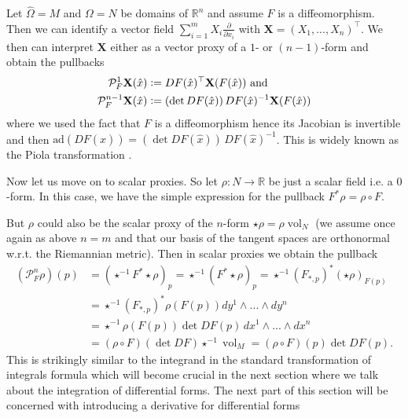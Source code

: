 \documentclass[12pt,a4paper]{article}
\numberwithin{equation}{subsection}
\numberwithin{lemma}{subsection}
\theoremstyle{definition}
\DeclareMathOperator{\vol}{vol}
\newcommand{\real}{\mathbb{R}}
\begin{document}
Let $\hat{\Omega} = M$ and $\Omega = N$ be domains of $\real^n$ and assume 
$F$ is a diffeomorphism. Then we 
can identify a vector field $\sum_{i=1}^m X_i \frac{\partial}{\partial x_i}$
with $\mathbf{X} = (X_1,...,X_n)^\top$. We then can interpret $\mathbf{X}$ 
either as a vector proxy of a $1$- or $(n-1)$-form and obtain the pullbacks
\begin{align*}
    \mathcal{P}^1_F \mathbf{X}(\hat{x}) &\vcentcolon= DF(\hat{x})^\top \mathbf{X}(F(\hat{x})) \text{ and}
    \\ \mathcal{P}^{n-1}_F \mathbf{X}(\hat{x}) &\vcentcolon= (\det DF(\hat{x}))\,
        DF(\hat{x})^{-1} \mathbf{X}(F(\hat{x}))
\end{align*}
where we used the fact that $F$ is a diffeomorphism hence its Jacobian 
is invertible and then $\text{ad}(DF(\hat{x})) = (\det DF(\hat{x}))\,
DF(\hat{x})^{-1}$.
This is widely known as the Piola transformation \cite[Def.\,9.8]{ern_guermond}.

Now let us move on to scalar proxies. So let $\rho: N \rightarrow \real$ be 
just a scalar field i.e. a $0$-form. In this case, we 
have the simple expression for the pullback $F^* \rho = \rho \circ F$. 

But $\rho$ could also be the scalar proxy of the $n$-form 
$\star \rho = \rho \vol_N$ (we assume once again 
as above
$n=m$ and that our basis of the tangent spaces are orthonormal w.r.t. the 
Riemannian metric). Then in scalar proxies we obtain the pullback
\begin{align*}
    (\mathcal{P}_F^n \rho )(p) 
    &= (\star ^{-1}F^* \star \rho)_p
    = \star ^{-1} (F^* \star \rho)_p
    = \star ^{-1} (F_{*,p})^* (\star \rho)_{F(p)}
    \\ &= \star ^{-1} (F_{*,p})^* \rho(F(p)) dy^1 \wedge ... \wedge dy^n
    \\ &= \star ^{-1} \rho(F(p)) \det DF(p) \, dx^1 \wedge ... \wedge dx^n
    \\ &=  (\rho \circ F) (\det DF) \star^{-1}\vol_M
    = (\rho \circ F)(p) \det DF(p).
\end{align*}
This is strikingly similar to the integrand in the standard transformation 
of integrals formula which will become crucial in the next section
where we talk about the
integration of differential forms. The next part of this section will be 
concerned with introducing a derivative for differential forms
\end{document}
